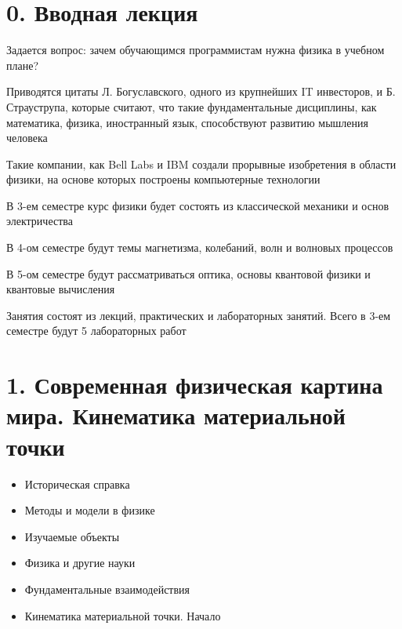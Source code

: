 \documentclass[12pt]{article}
\begin{document}
    \tableofcontents
    \clearpage


    \section{0. Вводная лекция}

    Задается вопрос: зачем обучающимся программистам нужна физика в учебном плане?

    Приводятся цитаты Л. Богуславского, одного из крупнейших IT инвесторов, и Б. Страуструпа, которые считают,
    что такие фундаментальные дисциплины, как математика, физика, иностранный язык, способствуют развитию
    мышления человека

    Такие компании, как Bell Labs и IBM создали прорывные изобретения в области физики, на основе которых
    построены компьютерные технологии

    В 3-ем семестре курс физики будет состоять из классической механики и основ электричества

    В 4-ом семестре будут темы магнетизма, колебаний, волн и волновых процессов

    В 5-ом семестре будут рассматриваться оптика, основы квантовой физики и квантовые вычисления

    Занятия состоят из лекций, практических и лабораторных занятий.
    Всего в 3-ем семестре будут 5 лабораторных работ


    \section{1. Современная физическая картина мира. Кинематика материальной точки}

        \begin{tcolorbox}[colframe=blue!25, colback=blue!10, title=\textbf{План лекции}]

        \footnotesize
        \begin{itemize}
            \item Историческая справка
            \item Методы и модели в физике
            \item Изучаемые объекты
            \item Физика и другие науки
            \item Фундаментальные взаимодействия
            \item Кинематика материальной точки. Начало
        \end{itemize}
    \end{tcolorbox}
\end{document}
